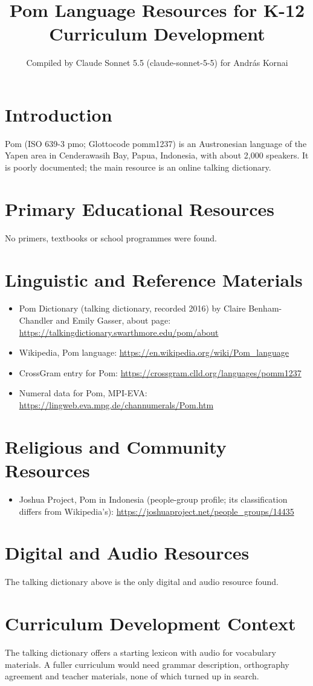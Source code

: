 \documentclass[12pt]{article}
\title{Pom Language Resources for K-12 Curriculum Development}
\author{Compiled by Claude Sonnet 5.5 (claude-sonnet-5-5) for Andr\'as Kornai}
\date{}
\begin{document}
\maketitle

\section{Introduction}
Pom (ISO 639-3 pmo; Glottocode pomm1237) is an Austronesian language of the Yapen area in Cenderawasih Bay, Papua, Indonesia, with about 2,000 speakers. It is poorly documented; the main resource is an online talking dictionary.

\section{Primary Educational Resources}
No primers, textbooks or school programmes were found.

\section{Linguistic and Reference Materials}
\begin{itemize}
\item Pom Dictionary (talking dictionary, recorded 2016) by Claire Benham-Chandler and Emily Gasser, about page: \url{https://talkingdictionary.swarthmore.edu/pom/about}
\item Wikipedia, Pom language: \url{https://en.wikipedia.org/wiki/Pom_language}
\item CrossGram entry for Pom: \url{https://crossgram.clld.org/languages/pomm1237}
\item Numeral data for Pom, MPI-EVA: \url{https://lingweb.eva.mpg.de/channumerals/Pom.htm}
\end{itemize}

\section{Religious and Community Resources}
\begin{itemize}
\item Joshua Project, Pom in Indonesia (people-group profile; its classification differs from Wikipedia's): \url{https://joshuaproject.net/people_groups/14435}
\end{itemize}

\section{Digital and Audio Resources}
The talking dictionary above is the only digital and audio resource found.

\section{Curriculum Development Context}
The talking dictionary offers a starting lexicon with audio for vocabulary materials. A fuller curriculum would need grammar description, orthography agreement and teacher materials, none of which turned up in search.
\end{document}
